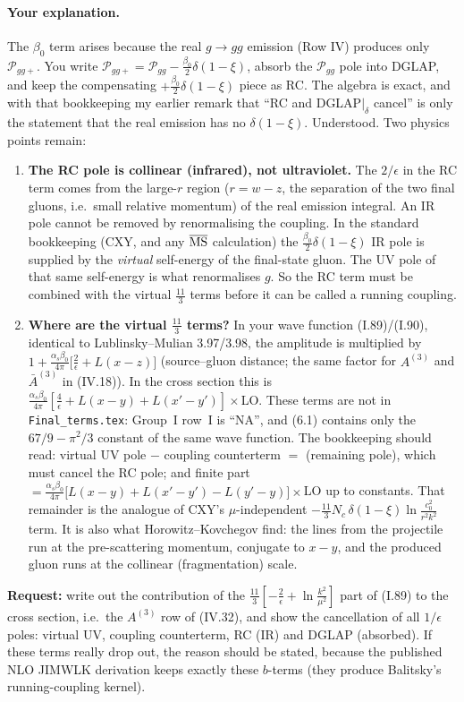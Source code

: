 \documentclass[10pt]{article}
\begin{document}
\paragraph{Your explanation.} The $\beta_0$ term arises because the real $g\to gg$ emission (Row IV) produces only $\mathcal P_{gg+}$. You write
$\mathcal P_{gg+}=\mathcal P_{gg}-\frac{\beta_0}{2}\delta(1-\xi)$, absorb the $\mathcal P_{gg}$ pole into DGLAP, and keep the compensating
$+\frac{\beta_0}{2}\delta(1-\xi)$ piece as RC. The algebra is exact, and with that bookkeeping my earlier remark that ``RC and DGLAP$|_\delta$ cancel'' is
only the statement that the real emission has no $\delta(1-\xi)$. Understood. Two physics points remain:
\begin{enumerate}
\item \textbf{The RC pole is collinear (infrared), not ultraviolet.} The $2/\epsilon$ in the RC term comes from the large-$r$ region ($r=w-z$, the separation of the two final gluons, i.e.\ small relative
momentum) of the real emission integral. An IR pole cannot be removed by renormalising the coupling. In the standard bookkeeping (CXY, and any
$\overline{\rm MS}$ calculation) the $\frac{\beta_0}{2}\delta(1-\xi)$ IR pole is supplied by the \emph{virtual} self-energy of the final-state
gluon. The UV pole of that same self-energy is what renormalises $g$. So the RC term must be combined with the virtual
$\frac{11}{3}$ terms before it can be called a running coupling.
\item \textbf{Where are the virtual $\frac{11}{3}$ terms?} In your wave function (I.89)/(I.90), identical to Lublinsky--Mulian 3.97/3.98, the amplitude is
multiplied by $1+\frac{\alpha_s\beta_0}{4\pi}\big[\frac2\epsilon+L(x-z)\big]$ (source--gluon distance; the same factor for $A^{(3)}$ and $\bar A^{(3)}$
in (IV.18)). In the cross section this is $\frac{\alpha_s\beta_0}{4\pi}[\frac4\epsilon+L(x-y)+L(x'-y')]\times$LO. These terms are not in
\texttt{Final\_terms.tex}: Group~I row~I is ``NA'', and (6.1) contains only the $67/9-\pi^2/3$ constant of the same wave function. The bookkeeping should read:
virtual UV pole $-$ coupling counterterm $=$ (remaining pole), which must cancel the RC pole; and finite part $=\frac{\alpha_s\beta_0}{4\pi}\big[L(x-y)+L(x'-y')-L(y'-y)\big]\times$LO up to
constants. That remainder is the analogue of CXY's $\mu$-independent $-\frac{11}{3}N_c\,\delta(1-\xi)\ln\frac{c_0^2}{r^2k^2}$ term. It is
also what Horowitz--Kovchegov find: the lines from the projectile run at the pre-scattering momentum, conjugate to $x-y$, and the produced gluon runs at the collinear (fragmentation) scale.
\end{enumerate}
\textbf{Request:} write out the contribution of the $\frac{11}{3}[-\frac2\epsilon+\ln\frac{k^2}{\mu^2}]$ part of (I.89) to the cross section, i.e.\ the
$A^{(3)}$ row of (IV.32), and show the cancellation of all $1/\epsilon$ poles: virtual UV, coupling counterterm, RC (IR) and DGLAP (absorbed). If
these terms really drop out, the reason should be stated, because the published NLO JIMWLK derivation keeps exactly these $b$-terms (they produce Balitsky's running-coupling kernel).
\end{document}
